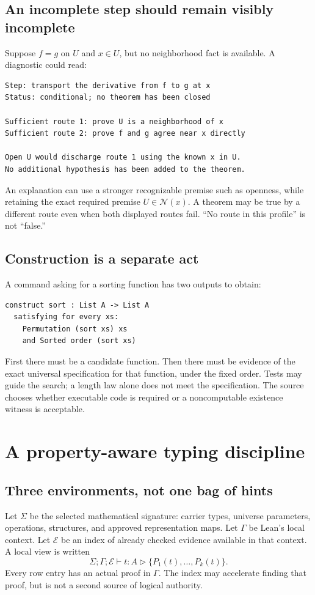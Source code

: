 \documentclass[11pt,a4paper]{article}
\newcommand{\view}{\mathrel{\triangleright}}\newcommand{\supp}{\operatorname{supp}}
\theoremstyle{definition}\newtheorem{definition}[theorem]{Definition}
\theoremstyle{remark}\newtheorem{remark}[theorem]{Remark}
\begin{document}
\subsection{An incomplete step should remain visibly incomplete}
Suppose $f=g$ on $U$ and $x\in U$, but no neighborhood fact is available. A diagnostic could read:
\begin{lstlisting}
Step: transport the derivative from f to g at x
Status: conditional; no theorem has been closed

Sufficient route 1: prove U is a neighborhood of x
Sufficient route 2: prove f and g agree near x directly

Open U would discharge route 1 using the known x in U.
No additional hypothesis has been added to the theorem.
\end{lstlisting}
An explanation can use a stronger recognizable premise such as openness, while retaining the exact required premise $U\in\mathcal N(x)$. A theorem may be true by a different route even when both displayed routes fail. ``No route in this profile'' is not ``false.''

\subsection{Construction is a separate act}
A command asking for a sorting function has two outputs to obtain:
\begin{lstlisting}
construct sort : List A -> List A
  satisfying for every xs:
    Permutation (sort xs) xs
    and Sorted order (sort xs)
\end{lstlisting}
First there must be a candidate function. Then there must be evidence of the exact universal specification for that function, under the fixed order. Tests may guide the search; a length law alone does not meet the specification. The source chooses whether executable code is required or a noncomputable existence witness is acceptable.

\section{A property-aware typing discipline}
\label{sec:types}
\subsection{Three environments, not one bag of hints}
Let $\Sigma$ be the selected mathematical signature: carrier types, universe parameters, operations, structures, and approved representation maps. Let $\Gamma$ be Lean's local context. Let $\mathcal E$ be an index of already checked evidence available in that context. A local view is written
\[
  \Sigma;\Gamma;\mathcal E\vdash t:A\view\{P_1(t),\ldots,P_k(t)\}.
\]
Every row entry has an actual proof in $\Gamma$. The index may accelerate finding that proof, but is not a second source of logical authority.
\end{document}
